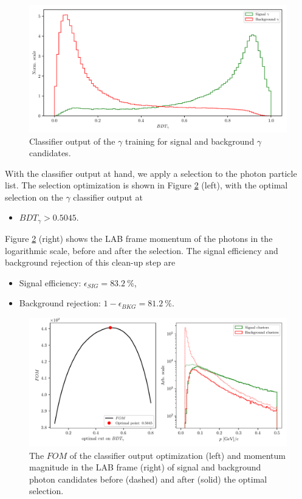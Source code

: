 \begin{figure}[H]
	\centering
	\captionsetup{width=0.8\linewidth}
	\includegraphics[width=\linewidth]{fig/ROECleanup_gamma}
	\caption{Classifier output of the $\gamma$ training for signal and background $\gamma$ candidates.}
	\label{fig:ROE_gamma}
\end{figure}

With the classifier output at hand, we apply a selection to the photon particle list. The selection optimization is shown in Figure \ref{fig:ROE_gamma_opt} (left), with the optimal selection on the $\gamma$ classifier output at
\begin{itemize}
	\item $BDT_\gamma > 0.5045$.
\end{itemize}

Figure \ref{fig:ROE_gamma_opt} (right) shows the LAB frame momentum of the photons in the logarithmic scale, before and after the selection. The signal efficiency and background rejection of this clean-up step are
\begin{itemize}
	\item Signal efficiency: $\epsilon_{SIG} = 83.2~\%$,
	\item Background rejection: $1-\epsilon_{BKG} = 81.2~\%$.
\end{itemize}

\begin{figure}[H]
	\centering
	\captionsetup{width=0.8\linewidth}
	\includegraphics[width=\linewidth]{fig/ROECleanup_gamma_opt}
	\caption{The $FOM$ of the classifier output optimization (left) and  momentum magnitude in the LAB frame (right) of signal and background photon candidates before (dashed) and after (solid) the optimal selection.}
	\label{fig:ROE_gamma_opt}
\end{figure}

